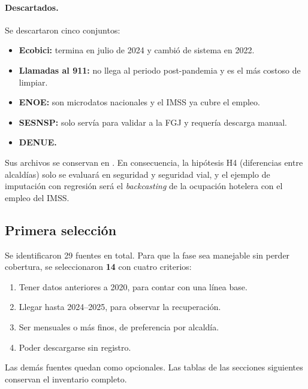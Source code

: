 \paragraph{Descartados.} Se descartaron cinco conjuntos:
\begin{itemize}
  \item \textbf{Ecobici:} termina en julio de 2024 y cambió de sistema en 2022.
  \item \textbf{Llamadas al 911:} no llega al periodo post-pandemia y es el más costoso de limpiar.
  \item \textbf{ENOE:} son microdatos nacionales y el IMSS ya cubre el empleo.
  \item \textbf{SESNSP:} solo servía para validar a la FGJ y requería descarga manual.
  \item \textbf{DENUE.}
\end{itemize}
Sus archivos se conservan en . En consecuencia, la hipótesis H4 (diferencias entre
alcaldías) solo se evaluará en seguridad y seguridad vial, y el ejemplo de imputación con regresión
será el \emph{backcasting} de la ocupación hotelera con el empleo del IMSS.

\subsection{Primera selección}\label{sec:seleccion}
Se identificaron 29 fuentes en total. Para que la fase sea manejable sin perder cobertura, se
seleccionaron \textbf{14} con cuatro criterios:
\begin{enumerate}
  \item Tener datos anteriores a 2020, para contar con una línea base.
  \item Llegar hasta 2024--2025, para observar la recuperación.
  \item Ser mensuales o más finos, de preferencia por alcaldía.
  \item Poder descargarse sin registro.
\end{enumerate}
Las demás fuentes quedan como opcionales. Las tablas de las secciones siguientes conservan el
inventario completo.

